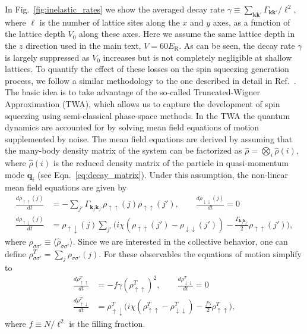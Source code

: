 \documentclass[aps,prx,superscriptaddress,notitlepage,twocolumn,longbibliography]{revtex4-1}
\newcommand{\up}{\uparrow}
\newcommand{\dn}{\downarrow}
\begin{document}
In Fig.~\ref{fig:inelastic_rates} we show  the averaged decay rate $\gamma\equiv\sum_{{\bm k}{\bm k'}}\Gamma_{{\bm k}{\bm k'}}/\ell^2$, where $\ell$ is the number of lattice sites along the $x$ and $y$ axes, as a function of the  lattice depth $V_0$ along these axes. Here we assume  the same lattice depth  in the $z$ direction used in the main text, $V=60E_{\text{R}}$.  As can be seen, the decay rate $\gamma$ is largely suppressed as $V_0$ increases  but is not completely negligible at shallow lattices.
To quantify the effect of these losses on the spin squeezing generation process, we follow a similar methodology to the one described in detail in Ref.~\cite{rey2014probing}. The basic idea is to take advantage of the so-called Truncated-Wigner Approximation (TWA)\cite{Polkovnikok2010, Schachenmayer2015}, which allows us to capture the development of spin squeezing using semi-classical phase-space methods. In the  TWA the quantum dynamics are accounted for by solving mean field equations of motion supplemented by noise. The mean field equations are  derived by assuming that the many-body density matrix of the system can be factorized as
$\hat{\rho}= \bigotimes_{i} \hat{\rho}({i})$, where $\hat{\rho}(i)$ is the reduced density matrix of the  particle in quasi-momentum  mode  ${\bm q}_i$ (see Eqn.~\eqref{eq:decay_matrix}). Under this assumption, the non-linear mean field equations are given by 
\begin{align}
\frac{d\rho_{\up\up}(j)}{dt}&=-\sum_{j'}\Gamma_{{\bm k}_j{\bm k}_{j'}} \rho_{\up\up}(j) \rho_{\up\up}(j'), \qquad \frac{d\rho_{\dn \dn}(j)}{dt}=0\\
\frac{d\rho_{\up\dn}(j)}{dt}&= \rho_{\up\dn}(j) \sum_{j'}\Big ( i  \chi(\rho_{\up\up}(j')-\rho_{\dn\dn}(j'))-\frac{\Gamma_{{\bm k}_j{\bm k}_{j'}}}{2} \rho_{\up\up}(j')\Big),\nonumber
\label{eq:MeanfieldEq}
\end{align}
where $\rho_{\sigma\sigma'}\equiv\langle\hat{\rho}_{\sigma\sigma'}\rangle$.
Since we are interested in the collective behavior, one can define $\rho_{\sigma\sigma'}^T=\sum_j \rho_{\sigma\sigma'}(j)$. For these observables the equations of motion simplify to
\begin{align}
\frac{d\rho_{\up\up}^T}{dt}&=-f\gamma  (\rho_{\up\up}^T)^2, \qquad \frac{d\rho_{\dn \dn}^T}{dt}=0\\
\frac{d\rho_{\up\dn}^T}{dt}&= \rho_{\up\dn}^T \Big (i  \chi(\rho_{\up\up}^T-\rho_{\dn\dn}^T)-\frac{f\gamma}{2} \rho_{\up\up}^T\Big),\nonumber
\label{eq:MeanfieldEq}
\end{align}
where $f\equiv N/\ell^2$ is the filling fraction.
\end{document}
